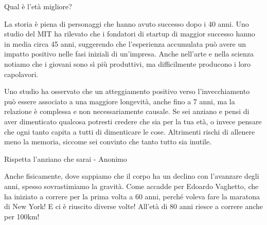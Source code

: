 \documentclass[12pt]{book} %
\begin{document}
\begin{mdframed}[linewidth=1pt]
Qual è l'età migliore?

La storia è piena di personaggi che hanno avuto successo dopo i 40 anni. Uno studio del MIT ha rilevato che i fondatori di startup di maggior successo hanno in media circa 45 anni, suggerendo che l’esperienza accumulata può avere un impatto positivo nelle fasi iniziali di un’impresa. Anche nell'arte e
nella scienza notiamo che i giovani sono sì più produttivi, ma difficilmente producono i loro capolavori.

Uno studio ha osservato che un atteggiamento positivo verso l’invecchiamento può essere associato a una maggiore longevità, anche fino a 7 anni, ma la relazione è complessa e non necessariamente causale. Se sei anziano e pensi di aver dimenticato
qualcosa potresti credere che sia per la tua età, o invece pensare che ogni tanto capita a tutti di dimenticare le cose. Altrimenti rischi di allenere meno la memoria, siccome sei convinto che tanto tutto sia inutile.

Rispetta l'anziano che sarai - Anonimo

Anche fisicamente, dove sappiamo che il corpo ha un declino con l'avanzare degli anni, spesso
sovrastimiamo la gravità. Come accadde per Edoardo Vaghetto, che ha iniziato a correre per la prima volta a 60 anni, perché voleva fare la maratona di New York! E ci è riuscito
diverse volte! All'età di 80 anni riesce a correre anche per 100km!
\end{mdframed}
\end{document}
